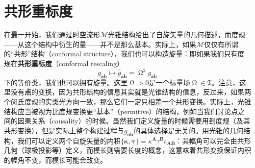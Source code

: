 \section{共形重标度}

在最一开始，我们通过时空流形$\mathcal{M}$光锥结构给出了自旋矢量的几何描述，而度规——从这个结构中衍生的量——并不是那么基本。实际上，如果$\mathcal{M}$仅仅有所谓的“共形”结构（conformal structure），我们也可以构造旋量：即如果我们只有度规在\textbf{共形重标度}（conformal rescaling）
\begin{equation*}
	g_{\boldsymbol{ab}} \mapsto \hat{g}_{\boldsymbol{ab}} =\upOmega^{2} g_{\boldsymbol{ab}}
\end{equation*}
下的等价类，我们也可以拥有旋量。这里$\upOmega >0$是一个标量场$\upOmega\in \mathfrak{T}$。注意，这里没有\textbf{点}的变换，因为共形结构的信息其实就是光锥结构的信息，反过来，如果两个闵氏度规的实类光方向一致，那么它们一定只相差一个共形变换。实际上，光锥结构应当被视为比度规变换更“基本”（permitive）的结构，例如当我们讨论点之间的因果关系（causality）的时候。虽然我们定义旋量的时候需要用到度规（及其共形变换），但是实际上整个构建过程与$g_{\boldsymbol{ab}}$的具体选择是无关的。用光锥的几何结构，我们可以定义两个自旋矢量的内积$\{\boldsymbol{\kappa } ,\boldsymbol{\tau }\} =\kappa ^{\boldsymbol{A}} \tau ^{\boldsymbol{B}} \epsilon _{\boldsymbol{AB}}$：其幅角可以完全由共形几何（球极投影等）定义，而模长则需要长度的概念，这意味着共形变换保证内积的幅角不变，而模长可能会改变。



